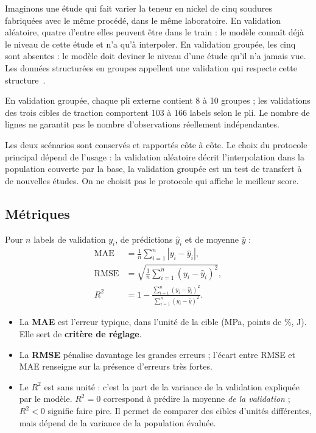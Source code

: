 \begin{intuition}
Imaginons une étude qui fait varier la teneur en nickel de cinq soudures
fabriquées avec le même procédé, dans le même laboratoire. En validation
aléatoire, quatre d'entre elles peuvent être dans le train : le modèle
\og connaît \fg{} déjà le niveau de cette étude et n'a qu'à interpoler. En
validation groupée, les cinq sont absentes : le modèle doit deviner le niveau
d'une étude qu'il n'a jamais vue. Les données structurées en groupes appellent
une validation qui respecte cette structure~\cite{roberts_2017}.
\end{intuition}

En validation groupée, chaque pli externe contient 8 à 10 groupes ; les
validations des trois cibles de traction comportent 103 à 166 labels selon le
pli. Le nombre de lignes ne garantit pas le nombre d'observations réellement
indépendantes.

\begin{decision}
Les deux scénarios sont conservés et rapportés côte à côte. Le choix du
protocole \og principal \fg{} dépend de l'usage : la validation aléatoire décrit
l'interpolation dans la population couverte par la base, la validation groupée
est un test de transfert à de nouvelles études. On ne choisit pas le protocole
qui affiche le meilleur score.
\end{decision}

\subsection{Métriques}
\label{subsec:metriques}

Pour $n$ labels de validation $y_i$, de prédictions $\hat{y}_i$ et de moyenne $\bar{y}$ :
\begin{align}
  \mathrm{MAE}  &= \frac{1}{n}\sum_{i=1}^{n} |y_i - \hat{y}_i|, \\
  \mathrm{RMSE} &= \sqrt{\frac{1}{n}\sum_{i=1}^{n} (y_i - \hat{y}_i)^2}, \\
  R^2 &= 1 - \frac{\sum_{i=1}^{n} (y_i - \hat{y}_i)^2}{\sum_{i=1}^{n} (y_i - \bar{y})^2}.
\end{align}

\begin{itemize}
  \item La \textbf{MAE} est l'erreur typique, dans l'unité de la cible (MPa, points de \%, J). Elle sert de \textbf{critère de réglage}.
  \item La \textbf{RMSE} pénalise davantage les grandes erreurs ; l'écart entre RMSE et MAE renseigne sur la présence d'erreurs très fortes.
  \item Le \textbf{$R^2$} est sans unité : c'est la part de la variance de la validation expliquée par le modèle. $R^2 = 0$ correspond à prédire la moyenne \emph{de la validation} ; $R^2 < 0$ signifie faire pire. Il permet de comparer des cibles d'unités différentes, mais dépend de la variance de la population évaluée.
\end{itemize}


